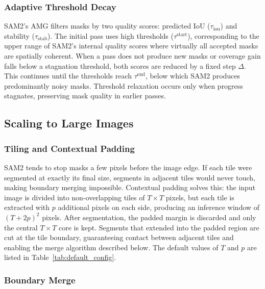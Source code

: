 \documentclass[review,11pt,authoryear]{elsarticle}
\begin{document}
\subsubsection{Adaptive Threshold Decay}
\label{sec:method_threshold}

SAM2's AMG filters masks by two quality scores: predicted IoU ($\tau_{\text{iou}}$) and stability ($\tau_{\text{stab}}$). The initial pass uses high thresholds ($\tau^{\text{start}}$), corresponding to the upper range of SAM2's internal quality scores where virtually all accepted masks are spatially coherent. When a pass does not produce new masks or coverage gain falls below a stagnation threshold, both scores are reduced by a fixed step $\Delta$. This continues until the thresholds reach $\tau^{\text{end}}$, below which SAM2 produces predominantly noisy masks. Threshold relaxation occurs only when progress stagnates, preserving mask quality in earlier passes.

\subsection{Scaling to Large Images}
\label{sec:method_scaling}

\subsubsection{Tiling and Contextual Padding}
\label{sec:method_tiling}

SAM2 tends to stop masks a few pixels before the image edge. If each tile were segmented at exactly its final size, segments in adjacent tiles would never touch, making boundary merging impossible. Contextual padding solves this: the input image is divided into non-overlapping tiles of $T \times T$ pixels, but each tile is extracted with $p$ additional pixels on each side, producing an inference window of $(T + 2p)^2$ pixels. After segmentation, the padded margin is discarded and only the central $T \times T$ core is kept. Segments that extended into the padded region are cut at the tile boundary, guaranteeing contact between adjacent tiles and enabling the merge algorithm described below. The default values of $T$ and $p$ are listed in Table~\ref{tab:default_config}.

\subsubsection{Boundary Merge}
\label{sec:method_merge}
\end{document}
